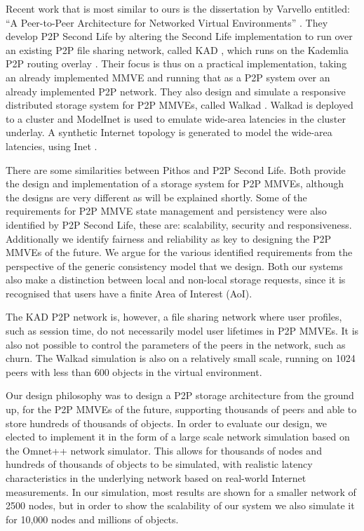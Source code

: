 Recent work that is most similar to ours is the dissertation by Varvello entitled: ``A Peer-to-Peer Architecture for Networked Virtual Environments'' \cite{varvello_phd}. They develop P2P Second Life by altering the Second Life implementation to run over an existing P2P file sharing network, called KAD \cite{KAD_Steiner}, which runs on the Kademlia P2P routing overlay \cite{Kademlia_Maymounkov}. Their focus is thus on a practical implementation, taking an already implemented MMVE and running that as a P2P system over an already implemented P2P network. They also design and simulate a responsive distributed storage system for P2P MMVEs, called Walkad \cite{Walkad_Varvello}. Walkad is deployed to a cluster and ModelInet \cite{ModelInet_Vahdat} is used to emulate wide-area latencies in the cluster underlay. A synthetic Internet topology is generated to model the wide-area latencies, using Inet \cite{Inet_warwick_jamin}.

There are some similarities between Pithos and P2P Second Life. Both provide the design and implementation of a storage system for P2P MMVEs, although the designs are very different as will be explained shortly. Some of the requirements for P2P MMVE state management and persistency were also identified by P2P Second Life, these are: scalability, security and responsiveness. Additionally we identify fairness and reliability as key to designing the P2P MMVEs of the future. We argue for the various identified requirements from the perspective of the generic consistency model that we design. Both our systems also make a distinction between local and non-local storage requests, since it is recognised that users have a finite Area of Interest (AoI).

The KAD P2P network is, however, a file sharing network where user profiles, such as session time, do not necessarily model user lifetimes in P2P MMVEs. It is also not possible to control the parameters of the peers in the network, such as churn. The Walkad simulation is also on a relatively small scale, running on 1024 peers with less than 600 objects in the virtual environment.

Our design philosophy was to design a P2P storage architecture from the ground up, for the P2P MMVEs of the future, supporting thousands of peers and able to store hundreds of thousands of objects. In order to evaluate our design, we elected to implement it in the form of a large scale network simulation based on the Omnet++ network simulator. This allows for thousands of nodes and hundreds of thousands of objects to be simulated, with realistic latency characteristics in the underlying network based on real-world Internet measurements. In our simulation, most results are shown for a smaller network of 2500 nodes, but in order to show the scalability of our system we also simulate it for 10,000 nodes and millions of objects.

